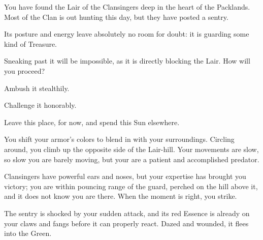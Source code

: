 



You have found the Lair of the Clansingers deep in the heart of the Packlands.
Most of the Clan is out hunting this day, but they have posted a sentry.

Its posture and energy leave absolutely no room for doubt: it is guarding some
kind of Treasure.

Sneaking past it will be impossible, as it is directly blocking the Lair. How
will you proceed?

\option Ambush it stealthily.

\option Challenge it honorably. 

\option Leave this place, for now, and spend this Sun elsewhere.
	 


You shift your armor's colors to blend in with your surroundings. Circling
around, you climb up the opposite side of the Lair-hill. Your movements are
slow, so slow you are barely moving, but your are a patient and accomplished
predator.

Clansingers have powerful ears and noses, but your expertise has brought you
victory; you are within pouncing range of the guard, perched on the hill above
it, and it does not know you are there. When the moment is right, you strike.

The sentry is shocked by your sudden attack, and its red Essence is already on
your claws and fangs before it can properly react. Dazed and wounded, it flees
into the Green.

